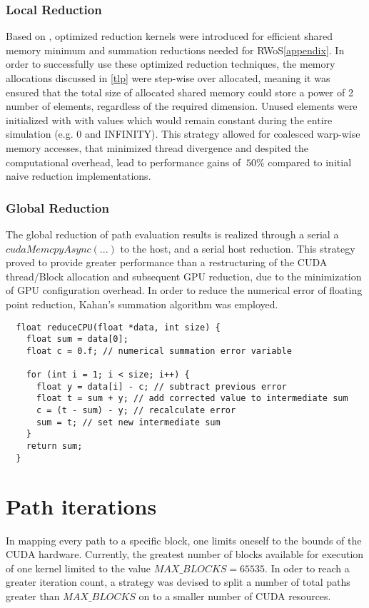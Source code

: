 \subsubsection{Local Reduction}
Based on \cite{harris}, optimized reduction kernels were introduced for efficient
shared memory minimum and summation reductions needed for \Gls{RWoS}\ref{appendix}.
In order to successfully use these optimized reduction techniques, the memory allocations
discussed in \ref{tlp} were step-wise over allocated, meaning it was ensured that
the total size of allocated shared memory could store a power of 2 number of elements,
regardless of the required dimension.  Unused elements were initialized with with
values which would remain constant during the entire simulation (e.g. 0 and INFINITY).
This strategy allowed for coalesced warp-wise memory accesses, that minimized
thread divergence and despited the computational overhead, lead to performance gains
of $~50\%$ compared to initial naive reduction implementations.
\subsubsection{Global Reduction}
The global reduction of path evaluation results is realized through a serial
a $cudaMemcpyAsync(...)$ to the host, and a serial host reduction.  This strategy
proved to provide greater performance than a restructuring of the CUDA thread/Block
allocation and subsequent GPU reduction, due to the minimization of GPU configuration
overhead.  In order to reduce the numerical error of floating point reduction,
Kahan's summation algorithm was employed.
\begin{lstlisting}
  float reduceCPU(float *data, int size) {
    float sum = data[0];
    float c = 0.f; // numerical summation error variable

    for (int i = 1; i < size; i++) {
      float y = data[i] - c; // subtract previous error
      float t = sum + y; // add corrected value to intermediate sum
      c = (t - sum) - y; // recalculate error
      sum = t; // set new intermediate sum
    }
    return sum;
  }
\end{lstlisting}
\section{Path iterations}
In mapping every path to a specific block, one limits oneself to the bounds of the
CUDA hardware.  Currently, the greatest number of blocks available for execution
of one kernel limited to the value $MAX\_BLOCKS = 65535$.  In oder to reach a greater
iteration count, a strategy was devised to split a number of total paths greater
than $MAX\_BLOCKS$ on to a smaller number of \Gls{CUDA} resources.


